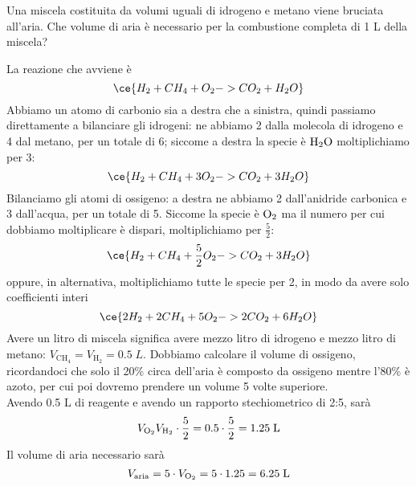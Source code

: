 \begin{esercizio}[$\bigstar$]
    Una miscela costituita da volumi uguali di idrogeno e metano viene bruciata all'aria\footnotemark. Che volume di aria è necessario per la combustione completa di 1 L della miscela?
\end{esercizio}
\begin{soluzione}
    La reazione che avviene è
    \begin{equation*}
        \ce{H_2 + CH_4 + O_2 -> CO_2 + H_2O}
    \end{equation*}
    Abbiamo un atomo di carbonio sia a destra che a sinistra, quindi passiamo direttamente a bilanciare gli idrogeni: ne abbiamo 2 dalla molecola di idrogeno e 4 dal metano, per un totale di 6; siccome a destra la specie è $\rm H_2O$ moltiplichiamo per 3:
    \begin{equation*}
        \ce{H_2 + CH_4 + 3O_2 -> CO_2 + 3H_2O}
    \end{equation*}
    Bilanciamo gli atomi di ossigeno: a destra ne abbiamo 2 dall'anidride carbonica e 3 dall'acqua, per un totale di 5. Siccome la specie è $\rm O_2$ ma il numero per cui dobbiamo moltiplicare è dispari, moltiplichiamo per $\frac{5}{2}$:
    \begin{equation*}
        \ce{H_2 + CH_4 + \frac{5}{2}O_2 -> CO_2 + 3H_2O}
    \end{equation*}
    oppure, in alternativa, moltiplichiamo tutte le specie per 2, in modo da avere solo coefficienti interi
    \begin{equation*}
        \ce{2H_2 + 2CH_4 + 5O_2 -> 2CO_2 + 6H_2O}
    \end{equation*}
    Avere un litro di miscela significa avere mezzo litro di idrogeno e mezzo litro di metano: $V_{\text{CH}_4}=V_{\text{H}_2}=0.5\;L$. Dobbiamo calcolare il volume di ossigeno, ricordandoci che solo il 20\% circa dell'aria è composto da ossigeno mentre l'80\% è azoto, per cui poi dovremo prendere un volume 5 volte superiore.\\
    Avendo 0.5 L di reagente e avendo un rapporto stechiometrico di 2:5, sarà
    \begin{equation*}
        V_{\text{O}_2}
        V_{\text{H}_2} \cdot \frac{5}{2}
        =0.5 \cdot \frac{5}{2}
        =1.25 \; \rm L
    \end{equation*}
    Il volume di aria necessario sarà
    \begin{equation*}
        V_{\text{aria}}
        =5 \cdot V_{\text{O}_2}
        =5 \cdot 1.25
        =6.25 \; \rm L
    \end{equation*}
\end{soluzione}

